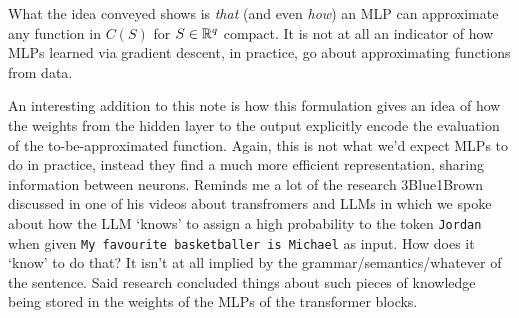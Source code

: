 \documentclass[11pt]{article}
\begin{document}
\begin{tcolorbox}[title={\centering\textbf{Is this idea practical?}}, colback=myLightBlue, colbacktitle=myDarkBlue, colframe=myDarkBlue, coltitle=white]
    What the idea conveyed shows is \textit{that} (and even \textit{how}) an MLP can approximate any function in $C(S)$ for $S\in\mathbb{R}^q$ compact. It is not at all an indicator of how MLPs learned via gradient descent, in practice, go about approximating functions from data.

    \hspace{14pt} An interesting addition to this note is how this formulation gives an idea of how the weights from the hidden layer to the output explicitly encode the evaluation of the to-be-approximated function. Again, this is not what we'd expect MLPs to do in practice, instead they find a much more efficient representation, sharing information between neurons. Reminds me a lot of the research 3Blue1Brown discussed in one of his videos about transfromers and LLMs in which we spoke about how the LLM `knows' to assign a high probability to the token \texttt{Jordan} when given \texttt{My favourite basketballer is Michael} as input. How does it `know' to do that? It isn't at all implied by the grammar/semantics/whatever of the sentence. Said research concluded things about such pieces of knowledge being stored in the weights of the MLPs of the transformer blocks.
\end{tcolorbox}
\end{document}

